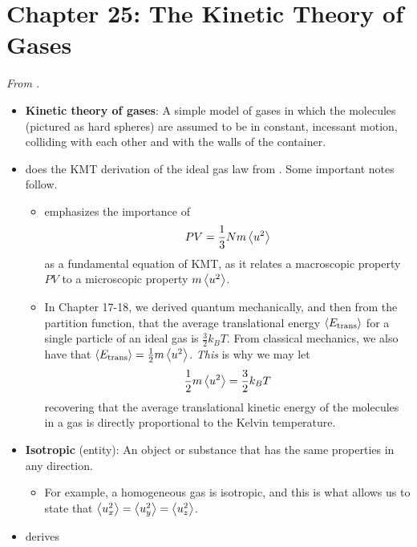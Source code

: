 \documentclass[../notes.tex]{subfiles}
\begin{document}
\section{Chapter 25: The Kinetic Theory of Gases}
\emph{From \textcite{bib:McQuarrieSimon}.}
\begin{itemize}
    \item {}\textbf{Kinetic theory of gases}: A simple model of gases in which the molecules (pictured as hard spheres) are assumed to be in constant, incessant motion, colliding with each other and with the walls of the container.
    \item \textcite{bib:McQuarrieSimon} does the KMT derivation of the ideal gas law from \textcite{bib:APChemNotes}. Some important notes follow.
    \begin{itemize}
        \item \textcite{bib:McQuarrieSimon} emphasizes the importance of
        \begin{equation*}
            PV = \frac{1}{3}Nm\left\langle{u^2}\right\rangle
        \end{equation*}
        as a fundamental equation of KMT, as it relates a macroscopic property $PV$ to a microscopic property $m\left\langle{u^2}\right\rangle$.
        \item In Chapter 17-18, we derived quantum mechanically, and then from the partition function, that the average translational energy $\left\langle{E_\text{trans}}\right\rangle$ for a single particle of an ideal gas is $\frac{3}{2}k_BT$. From classical mechanics, we also have that $\left\langle{E_\text{trans}}\right\rangle=\frac{1}{2}m\left\langle{u^2}\right\rangle$. \emph{This} is why we may let
        \begin{equation*}
            \frac{1}{2}m\left\langle{u^2}\right\rangle = \frac{3}{2}k_BT
        \end{equation*}
        recovering that the average translational kinetic energy of the molecules in a gas is directly proportional to the Kelvin temperature.
    \end{itemize}
    \item \textbf{Isotropic} (entity): An object or substance that has the same properties in any direction.
    \begin{itemize}
        \item For example, a homogeneous gas is isotropic, and this is what allows us to state that $\left\langle{u_x^2}\right\rangle=\left\langle{u_y^2}\right\rangle=\left\langle{u_z^2}\right\rangle$.
    \end{itemize}
    \item \textcite{bib:McQuarrieSimon} derives
    \begin{equation*}

\end{equation*}
\end{itemize}
\end{document}
